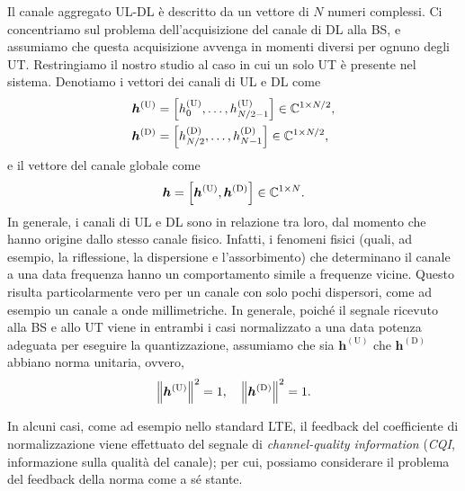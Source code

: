 Il canale aggregato UL-DL è descritto da un vettore di \(N\) numeri complessi.
Ci concentriamo sul problema dell'acquisizione del canale di DL alla BS, e
assumiamo che questa acquisizione avvenga in momenti diversi per ognuno degli
UT. Restringiamo il nostro studio al caso in cui un solo UT è presente nel
sistema. Denotiamo i vettori dei canali di UL e DL come
\begin{equation}
    \begin{aligned}
        \bm{h}^\mathrm{(U)} &= \mleft[
            h_0^\mathrm{(U)}, \dots, h_{N/2-1}^\mathrm{(U)}
            \mright] \in \C^{1 \times N/2},\\
        \bm{h}^\mathrm{(D)} &= \mleft[
            h_{N/2}^\mathrm{(D)}, \dots, h_{N-1}^\mathrm{(D)}
            \mright] \in \C^{1 \times N/2},
    \end{aligned}
\end{equation}
e il vettore del canale globale come
\begin{equation}
    \bm{h} = \mleft[
        \bm{h}^\mathrm{(U)}, \bm{h}^\mathrm{(D)}
        \mright] \in \C^{1 \times N}.
\end{equation}
In generale, i canali di UL e DL sono in relazione tra loro, dal momento che
hanno origine dallo stesso canale fisico. Infatti, i fenomeni fisici (quali, ad
esempio, la riflessione, la dispersione e l'assorbimento) che determinano il
canale a una data frequenza hanno un comportamento simile a frequenze vicine.
Questo risulta particolarmente vero per un canale con solo pochi dispersori,
come ad esempio un canale a onde millimetriche. In generale, poiché il segnale
ricevuto alla BS e allo UT viene in entrambi i casi normalizzato a una data
potenza adeguata per eseguire la quantizzazione, assumiamo che sia
\(\bm{h}^\mathrm{(U)}\) che \(\bm{h}^\mathrm{(D)}\) abbiano norma unitaria,
ovvero,
\begin{equation}
    \lnorm \bm{h}^\mathrm{(U)} \rnorm^2 = 1, \quad
    \lnorm \bm{h}^\mathrm{(D)} \rnorm^2 = 1.
\end{equation}

In alcuni casi, come ad esempio nello standard LTE, il feedback del
coefficiente di normalizzazione viene effettuato del segnale di
\textit{channel-quality information} (\textit{CQI}, informazione sulla qualità
del canale); per cui, possiamo considerare il problema del feedback della norma
come a sé stante.\footnotemark


